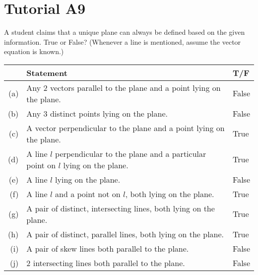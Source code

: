 \section{Tutorial A9}

\begin{problem}
    A student claims that a unique plane can always be defined based on the given information. True or False? (Whenever a line is mentioned, assume the vector equation is known.)

    \begin{table}[h]
        \centering
        \begin{tabularx}{\textwidth}{r X l}
        & \textbf{Statement} & \textbf{T/F}\\\hline
        (a) & Any 2 vectors parallel to the plane and a point lying on the plane. & False \\
        (b) & Any 3 distinct points lying on the plane. & False \\
        (c) & A vector perpendicular to the plane and a point lying on the plane. & True\\
        (d) & A line $l$ perpendicular to the plane and a particular point on $l$ lying on the plane. & True\\
        (e) & A line $l$ lying on the plane. & False\\
        (f) & A line $l$ and a point not on $l$, both lying on the plane. & True\\
        (g) & A pair of distinct, intersecting lines, both lying on the plane. & True\\
        (h) & A pair of distinct, parallel lines, both lying on the plane. & True\\
        (i) & A pair of skew lines both parallel to the plane. & False\\
        (j) & 2 intersecting lines both parallel to the plane. & False
        \end{tabularx}
    \end{table}
\end{problem}

